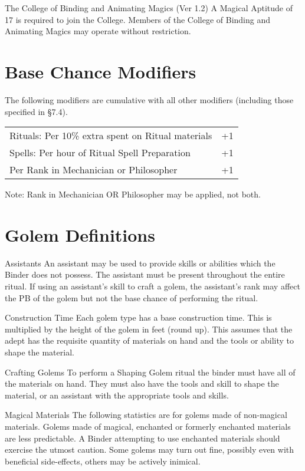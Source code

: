 \begin{Chapter}{The College of Binding and Animating Magics (Ver 1.2)}
A Magical Aptitude of 17 is required to join the College.  Members of
the College of Binding and Animating Magics may operate without
restriction.

\section{Base Chance Modifiers}

The following modifiers are cumulative with all other modifiers
(including those specified in §7.4).

\begin{tabularx}{\columnwidth}{Xr}
Rituals: Per 10\% extra spent on Ritual materials	& +1 \\
Spells: Per hour of Ritual Spell Preparation		& +1 \\
Per Rank in Mechanician or Philosopher			& +1 \\
\end{tabularx}

Note: Rank in Mechanician OR Philosopher may be applied, not both.


\section{Golem Definitions}

\begin{Description}
\item[Assistants] An assistant may be used to provide skills or
  abilities which the Binder does not possess.  The assistant must be
  present throughout the entire ritual.  If using an assistant’s skill
  to craft a golem, the assistant’s rank may affect the PB of the
  golem but not the base chance of performing the ritual.

\item[Construction Time] Each golem type has a base construction time.
  This is multiplied by the height of the golem in feet (round
  up). This assumes that the adept has the requisite quantity of
  materials on hand and the tools or ability to shape the material.

\item[Crafting Golems] To perform a Shaping Golem ritual the binder
  must have all of the materials on hand.  They must also have the
  tools and skill to shape the material, or an assistant with the
  appropriate tools and skills.

\item[Magical Materials] The following statistics are for golems made
  of non-magical materials.  Golems made of magical, enchanted or
  formerly enchanted materials are less predictable. A Binder
  attempting to use enchanted materials should exercise the utmost
  caution.  Some golems may turn out fine, possibly even with
  beneficial side-effects, others may be actively inimical.


\end{Description}
\end{Chapter}
